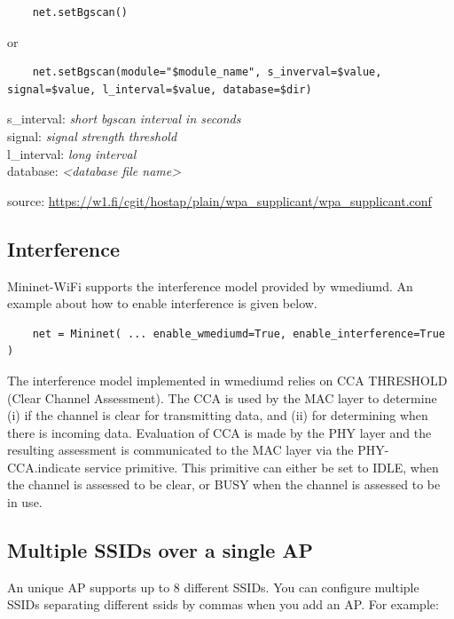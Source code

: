 \begin{verbatim}
    net.setBgscan()
\end{verbatim}
or
\begin{verbatim}
    net.setBgscan(module="$module_name", s_inverval=$value, signal=$value, l_interval=$value, database=$dir)
\end{verbatim}


\noindent s\_interval: \textit{short bgscan interval in seconds} \\
signal: \textit{signal strength threshold} \\
l\_interval: \textit{long interval} \\
database: \textit{<database file name>}

\noindent source: \url{https://w1.fi/cgit/hostap/plain/wpa_supplicant/wpa_supplicant.conf}

\subsection{Interference}
Mininet-WiFi supports the interference model provided by wmediumd. An example about how to enable interference is given below.

\begin{verbatim}
    net = Mininet( ... enable_wmediumd=True, enable_interference=True )
\end{verbatim}

The interference model implemented in wmediumd relies on CCA THRESHOLD (Clear Channel Assessment). The CCA is used by the MAC layer to determine (i) if the channel is clear for transmitting data, and (ii) for determining when there is incoming data. Evaluation of CCA is made by the PHY layer and the resulting assessment is communicated to the MAC layer via the PHY-CCA.indicate service primitive. This primitive can either be set to IDLE, when the channel is assessed to be clear, or BUSY when the channel is assessed to be in use.


\subsection{Multiple SSIDs over a single AP}
An unique AP supports up to 8 different SSIDs. You can configure multiple SSIDs separating different ssids by commas when you add an AP. For example:


